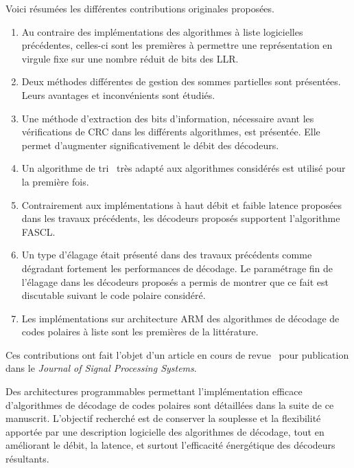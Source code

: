 Voici résumées les différentes contributions originales proposées.
\begin{enumerate}[label=(\roman*)]
  \item Au contraire des implémentations des algorithmes à liste logicielles précédentes, celles-ci sont les premières à permettre une représentation en virgule fixe sur une nombre réduit de bits des LLR.
  \item Deux méthodes différentes de gestion des sommes partielles sont présentées. Leurs avantages et inconvénients sont étudiés.
  \item Une méthode d'extraction des bits d'information, nécessaire avant les vérifications de CRC dans les différents algorithmes, est présentée. Elle permet d'augmenter significativement le débit des décodeurs.
  \item Un algorithme de tri~\cite{schreier_tournament_1932} très adapté aux algorithmes considérés est utilisé pour la première fois.
  \item Contrairement aux implémentations à haut débit et faible latence proposées dans les travaux précédents, les décodeurs proposés supportent l'algorithme FASCL.
  \item Un type d'élagage était présenté dans des travaux précédents comme dégradant fortement les performances de décodage. Le paramétrage fin de l'élagage dans les décodeurs proposés a permis de montrer que ce fait est discutable suivant le code polaire considéré.
  \item Les implémentations sur architecture ARM des algorithmes de décodage de codes polaires à liste sont les premières de la littérature.
\end{enumerate}
Ces contributions ont fait l'objet d'un article en cours de revue~ pour publication dans le \textit{Journal of Signal Processing Systems}.


Des architectures programmables permettant l'implémentation efficace d'algorithmes de décodage de codes polaires sont détaillées dans la suite de ce manuscrit. L'objectif recherché est de conserver  la souplesse et la flexibilité apportée par une description logicielle des algorithmes de décodage, tout en améliorant le débit, la latence, et surtout l'efficacité énergétique des décodeurs résultants.